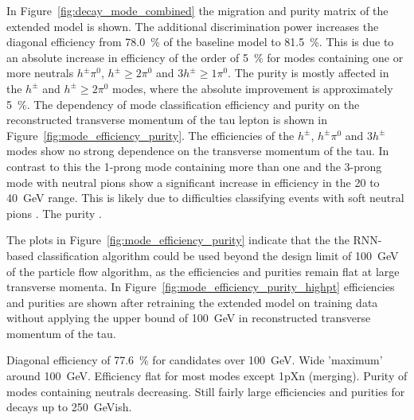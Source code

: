 In Figure~\ref{fig:decay_mode_combined} the migration and purity matrix of the
extended model is shown. The additional discrimination power increases the
diagonal efficiency from \SI{78.0}{\percent} of the baseline model to
\SI{81.5}{\percent}. This is due to an absolute increase in efficiency of the
order of \SI{5}{\percent} for modes containing one or more neutrals
$h^\pm \pi^0$, $h^\pm \geq 2\pi^0$ and $3h^\pm\geq1\pi^0$. The purity is mostly
affected in the $h^\pm$ and $h^\pm \geq 2\pi^0$ modes, where the absolute
improvement is approximately \SI{5}{\percent}. The dependency of mode
classification efficiency and purity on the reconstructed transverse momentum of
the tau lepton is shown in Figure~\ref{fig:mode_efficiency_purity}. The
efficiencies of the $h^\pm$, $h^\pm \pi^0$ and $3h^\pm$ modes show no strong
dependence on the transverse momentum of the tau. In contrast to this the
1-prong mode containing more than one and the 3-prong mode with neutral pions
show a significant increase in efficiency in the \num{20} to \SI{40}{\GeV}
range. This is likely due to difficulties classifying events with soft neutral
pions . The purity .

The plots in Figure~\ref{fig:mode_efficiency_purity} indicate that the the
RNN-based classification algorithm could be used beyond the design limit of
\SI{100}{\GeV} of the particle flow algorithm, as the efficiencies and purities
remain flat at large transverse momenta. In
Figure~\ref{fig:mode_efficiency_purity_highpt} efficiencies and purities are
shown after retraining the extended model on training data without applying the
upper bound of \SI{100}{\GeV} in reconstructed transverse momentum of the tau.

Diagonal efficiency of \SI{77.6}{\percent} for candidates over \SI{100}{\GeV}.
Wide 'maximum' around \SI{100}{\GeV}. Efficiency flat for most modes except 1pXn
(merging). Purity of modes containing neutrals decreasing. Still fairly large
efficiencies and purities for decays up to \SI{250}{\GeV}ish.

